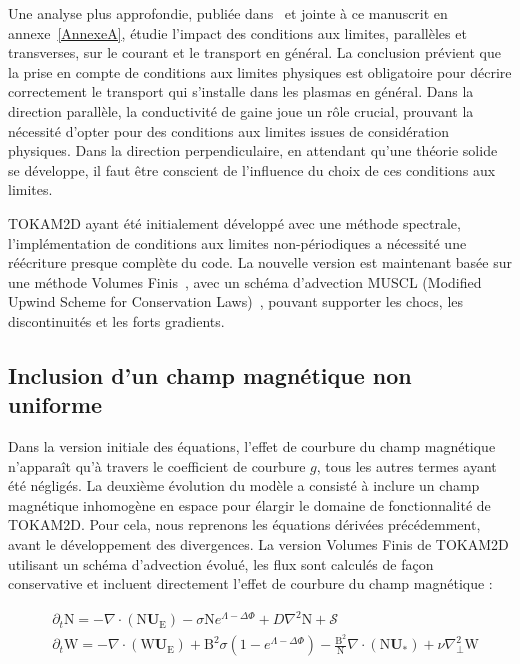 \begin{refsection}
	Une analyse plus approfondie, publiée dans~\parencite{Futtersack} et
	jointe à ce manuscrit en annexe~\ref{AnnexeA}, étudie l'impact des conditions
	aux limites, parallèles et transverses, sur le courant et le transport en général.
	La conclusion prévient que la prise en compte de conditions aux limites
	physiques est obligatoire pour décrire correctement le transport qui s'installe
	dans les plasmas en général. Dans la direction parallèle, la conductivité de
	gaine joue un rôle crucial, prouvant la nécessité d'opter pour des conditions
	aux limites issues de considération physiques. Dans la direction
	perpendiculaire, en attendant qu'une théorie solide se développe, il faut être
	conscient de l'influence du choix de ces conditions aux limites.
	
	TOKAM2D ayant été initialement
	développé avec une méthode spectrale, l'implémentation de conditions aux
	limites non-périodiques a nécessité une réécriture presque complète du code.
	La nouvelle version est maintenant basée sur une méthode Volumes
	Finis~\parencite{toro}, avec un schéma d'advection MUSCL (Modified Upwind
	Scheme for Conservation Laws)~\parencite{vanLeer}, pouvant supporter les chocs,
	les discontinuités et les forts gradients.
	
	\subsection{Inclusion d'un champ magnétique non uniforme}
	
	Dans la version initiale
	des équations, l'effet de courbure du champ magnétique n'apparaît qu'à travers
	le coefficient de courbure $g$, tous les autres termes ayant été négligés.
	La deuxième évolution du modèle a consisté à inclure un champ magnétique
	inhomogène en espace pour élargir le domaine de fonctionnalité de TOKAM2D. Pour
	cela, nous reprenons les équations dérivées précédemment, avant le développement
	des divergences. La version Volumes Finis de TOKAM2D utilisant un schéma
	d'advection évolué, les flux sont calculés de façon conservative et incluent
	directement l'effet de courbure du champ magnétique :
	
\begin{align}
\label{2-eqContinuiteMag}
&\partial_t \text{N}
= - \nabla\cdot\left(\text{N}\mathbf U_\text{E}\right) -\sigma
\text{N}e^{\Lambda-\Delta\Phi} + D\nabla^2 \text{N} + \mathcal{S}
\\
\label{2-eqCourantMag}
&\partial_{t}\text{W} = 
-\nabla\cdot\left(\text{W}\mathbf U_\text{E}\right)
+\text{B}^2\sigma\left(1-e^{\Lambda-\Delta\Phi}\right) 
-\frac{\text{B}^2}{\text{N}}\nabla\cdot\left(\text{N}\mathbf U_*\right) 
+\nu\nabla_\perp^2\text{W}
\end{align}


\end{refsection}
